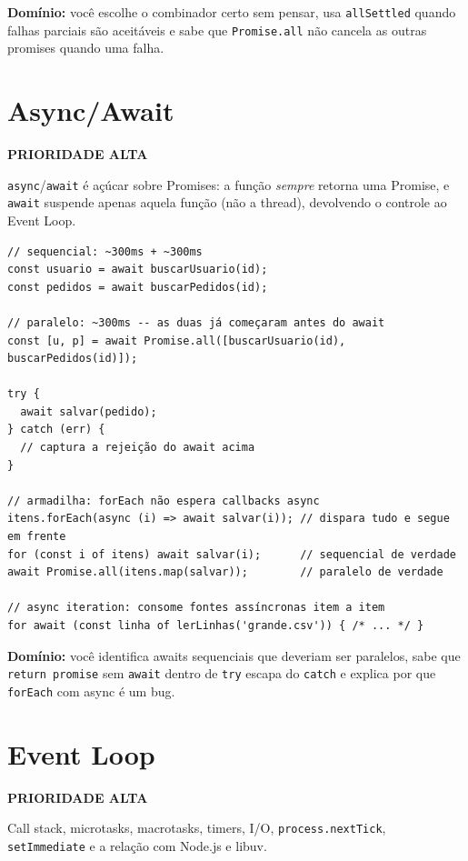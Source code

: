 \documentclass[12pt,a4paper,oneside]{book}
\newcommand{\alta}{\colorbox{red!15}{\sffamily\scriptsize\bfseries PRIORIDADE ALTA}}
\newcommand{\code}[1]{\texttt{#1}}
\newcommand{\dom}[1]{\begin{dominio}\textbf{Domínio:} #1\end{dominio}}
\begin{document}
\dom{você escolhe o combinador certo sem pensar, usa \code{allSettled} quando falhas parciais são aceitáveis e sabe que \code{Promise.all} não cancela as outras promises quando uma falha.}

\section{Async/Await}
\label{sec:async}
\alta

\code{async}/\code{await} é açúcar sobre Promises: a função \emph{sempre} retorna uma Promise, e \code{await} suspende apenas aquela função (não a thread), devolvendo o controle ao Event Loop.

\begin{verbatim}
// sequencial: ~300ms + ~300ms
const usuario = await buscarUsuario(id);
const pedidos = await buscarPedidos(id);

// paralelo: ~300ms -- as duas já começaram antes do await
const [u, p] = await Promise.all([buscarUsuario(id), buscarPedidos(id)]);

try {
  await salvar(pedido);
} catch (err) {
  // captura a rejeição do await acima
}

// armadilha: forEach não espera callbacks async
itens.forEach(async (i) => await salvar(i)); // dispara tudo e segue em frente
for (const i of itens) await salvar(i);      // sequencial de verdade
await Promise.all(itens.map(salvar));        // paralelo de verdade

// async iteration: consome fontes assíncronas item a item
for await (const linha of lerLinhas('grande.csv')) { /* ... */ }
\end{verbatim}

\dom{você identifica awaits sequenciais que deveriam ser paralelos, sabe que \code{return promise} sem \code{await} dentro de \code{try} escapa do \code{catch} e explica por que \code{forEach} com async é um bug.}

\section{Event Loop}
\label{sec:eventloop}
\alta

Call stack, microtasks, macrotasks, timers, I/O, \code{process.nextTick}, \code{setImmediate} e a relação com Node.js e libuv.
\end{document}
